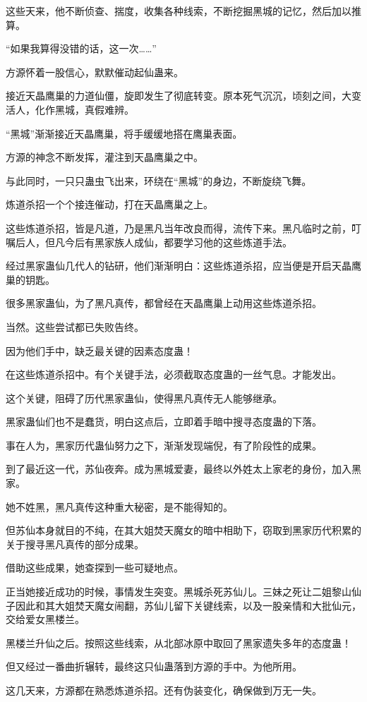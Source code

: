 \begin{this_body}
这些天来，他不断侦查、揣度，收集各种线索，不断挖掘黑城的记忆，然后加以推算。

“如果我算得没错的话，这一次……”

方源怀着一股信心，默默催动起仙蛊来。

接近天晶鹰巢的力道仙僵，旋即发生了彻底转变。原本死气沉沉，顷刻之间，大变活人，化作黑城，真假难辨。

“黑城”渐渐接近天晶鹰巢，将手缓缓地搭在鹰巢表面。

方源的神念不断发挥，灌注到天晶鹰巢之中。

与此同时，一只只蛊虫飞出来，环绕在“黑城”的身边，不断旋绕飞舞。

炼道杀招一个个接连催动，打在天晶鹰巢之上。

这些炼道杀招，皆是凡道，乃是黑凡当年改良而得，流传下来。黑凡临时之前，叮嘱后人，但凡今后有黑家族人成仙，都要学习他的这些炼道手法。

经过黑家蛊仙几代人的钻研，他们渐渐明白：这些炼道杀招，应当便是开启天晶鹰巢的钥匙。

很多黑家蛊仙，为了黑凡真传，都曾经在天晶鹰巢上动用这些炼道杀招。

当然。这些尝试都已失败告终。

因为他们手中，缺乏最关键的因素态度蛊！

在这些炼道杀招中。有个关键手法，必须截取态度蛊的一丝气息。才能发出。

这个关键，阻碍了历代黑家蛊仙，使得黑凡真传无人能够继承。

黑家蛊仙们也不是蠢货，明白这点后，立即着手暗中搜寻态度蛊的下落。

事在人为，黑家历代蛊仙努力之下，渐渐发现端倪，有了阶段性的成果。

到了最近这一代，苏仙夜奔。成为黑城爱妻，最终以外姓太上家老的身份，加入黑家。

她不姓黑，黑凡真传这种重大秘密，是不能得知的。

但苏仙本身就目的不纯，在其大姐焚天魔女的暗中相助下，窃取到黑家历代积累的关于搜寻黑凡真传的部分成果。

借助这些成果，她查探到一些可疑地点。

正当她接近成功的时候，事情发生突变。黑城杀死苏仙儿。三妹之死让二姐黎山仙子因此和其大姐焚天魔女闹翻，苏仙儿留下关键线索，以及一股亲情和大批仙元，交给爱女黑楼兰。

黑楼兰升仙之后。按照这些线索，从北部冰原中取回了黑家遗失多年的态度蛊！

但又经过一番曲折辗转，最终这只仙蛊落到方源的手中。为他所用。

这几天来，方源都在熟悉炼道杀招。还有伪装变化，确保做到万无一失。


\end{this_body}
